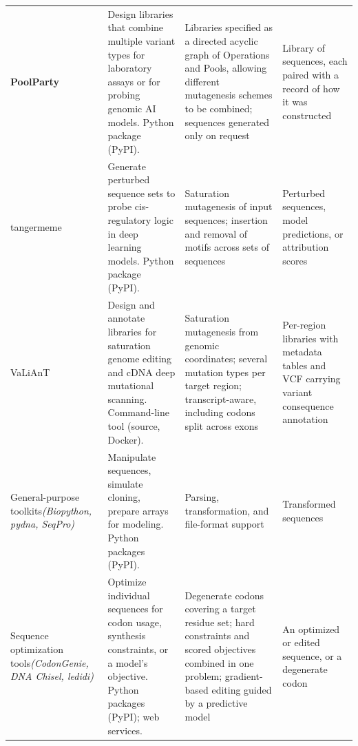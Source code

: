 \documentclass[11pt]{article}
\newcommand{\botrule}{\bottomrule}
\begin{document}
\begin{table}[tbp]
\begin{tabular}{@{}>{\raggedright\arraybackslash}p{2.0cm}>{\raggedright\arraybackslash}p{3.4cm}>{\raggedright\arraybackslash}p{4.3cm}>{\raggedright\arraybackslash}p{2.15cm}@{}}
\textbf{PoolParty} &
Design libraries that combine multiple variant types for laboratory assays or for probing genomic AI models. Python package (PyPI). &
Libraries specified as a directed acyclic graph of Operations and Pools, allowing different mutagenesis schemes to be combined; sequences generated only on request &
Library of sequences, each paired with a record of how it was constructed\\
\addlinespace

tangermeme \citep{Schreiber2025nd} &
Generate perturbed sequence sets to probe cis-regulatory logic in deep learning models. Python package (PyPI). &
Saturation mutagenesis of input sequences; insertion and removal of motifs across sets of sequences &
Perturbed sequences, model predictions, or attribution scores\\
\addlinespace

VaLiAnT \citep{Barbon2022th} &
Design and annotate libraries for saturation genome editing and cDNA deep mutational scanning. Command-line tool (source, Docker). &
Saturation mutagenesis from genomic coordinates; several mutation types per target region; transcript-aware, including codons split across exons &
Per-region libraries with metadata tables and VCF carrying variant consequence annotation\\
\midrule

General-purpose toolkits\newline\textit{(Biopython, pydna, SeqPro)} \citep{Cock2009df,Pereira2015wj,Klie2023kg} &
Manipulate sequences, simulate cloning, prepare arrays for modeling. Python packages (PyPI). &
Parsing, transformation, and file-format support &
Transformed sequences\\
\addlinespace

Sequence optimization tools\newline\textit{(CodonGenie, DNA Chisel, ledidi)} \citep{Swainston2017rb,Zulkower2020jk,Schreiber2025ledidi} &
Optimize individual sequences for codon usage, synthesis constraints, or a model's objective. Python packages (PyPI); web services. &
Degenerate codons covering a target residue set; hard constraints and scored objectives combined in one problem; gradient-based editing guided by a predictive model &
An optimized or edited sequence, or a degenerate codon\\
\botrule
\end{tabular}
\end{table}


\clearpage
\end{document}

